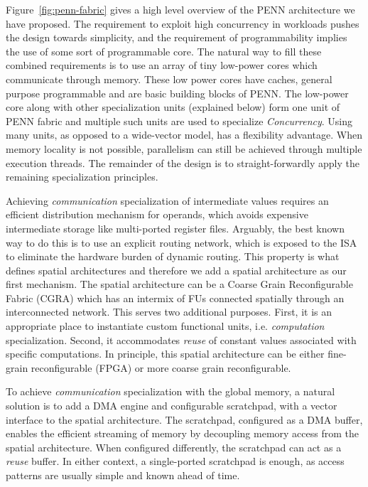 Figure~\ref{fig:penn-fabric} gives a high level overview of the PENN architecture 
we have proposed. 
The requirement to exploit high concurrency in workloads pushes the design towards simplicity, 
and the requirement of programmability implies the use of some sort of programmable core.
The natural way to fill these combined requirements is to use an array of tiny
low-power cores which communicate through memory.
These low power cores have caches, general purpose programmable and
are basic building blocks of PENN. The low-power core along with
other specialization units (explained below) form one unit of PENN fabric and
multiple such units are used to specialize \emph{Concurrency}.
Using many units, as opposed to a wide-vector model, has a flexibility advantage.  When
memory locality is not possible, parallelism can still be achieved through
multiple execution threads.  The remainder of the design is to straight-forwardly
apply the remaining specialization principles.

Achieving \emph{communication} specialization of intermediate values requires
an efficient distribution mechanism for operands, which avoids expensive
intermediate storage like multi-ported register files.  Arguably, the best
known way to do this is to use an explicit routing network, which is exposed to
the ISA to eliminate the hardware burden of dynamic routing.  This property is
what defines spatial architectures and therefore we add a spatial
architecture as our first mechanism. The spatial architecture 
can be a Coarse Grain Reconfigurable Fabric (CGRA) which has an
intermix of FUs connected spatially through an interconnected network. 
This serves two additional purposes.
First, it is an appropriate place to instantiate custom functional units, i.e.
\emph{computation} specialization.  Second, it accommodates \emph{reuse} of
constant values associated with specific computations.  In principle, this
spatial architecture can be either fine-grain reconfigurable (FPGA) or more
coarse grain reconfigurable.

To achieve \emph{communication} specialization with the global memory, a natural
solution is to add a DMA engine and configurable scratchpad, with a vector
interface to the spatial architecture.  The scratchpad, configured as a DMA
buffer, enables the efficient streaming of memory by decoupling memory access from the
spatial architecture.  When configured differently, the scratchpad can act as a
\emph{reuse} buffer.  In either context, a single-ported scratchpad is
enough, as access patterns are usually simple and known ahead of time.

